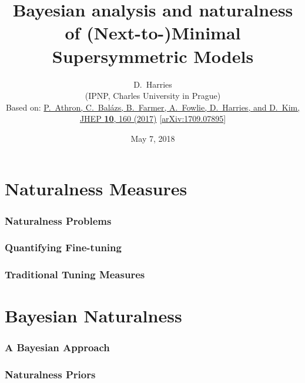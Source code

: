 \documentclass[10pt,aspectratio=169]{beamer}
\title{Bayesian analysis and naturalness of (Next-to-)Minimal
  Supersymmetric Models}
\author{D.~Harries\\
  {\scriptsize
    (IPNP, Charles University in Prague)}\\
  \vspace{25pt}
  { \scriptsize
    Based on: \href{https://doi.org/10.1007/JHEP10(2017)160}{%
      P.~Athron, C.~Bal\'{a}zs, B.~Farmer, A.~Fowlie, D.~Harries,
      and D.~Kim, JHEP \textbf{10}, 160 (2017)}
    [\href{https://arxiv.org/abs/1709.07895}{arXiv:1709.07895}]
  }
}
\date[Phenomenology 2018, University of Pittsburgh]{May 7, 2018}
\begin{document}
\begin{frame}[plain]
  \titlepage
\end{frame}

\section{Naturalness Measures}

\begin{frame}
  \frametitle{Naturalness Problems}
\end{frame}

\begin{frame}
  \frametitle{Quantifying Fine-tuning}
\end{frame}

\begin{frame}
  \frametitle{Traditional Tuning Measures}
\end{frame}

\section{Bayesian Naturalness}

\begin{frame}
  \frametitle{A Bayesian Approach}
\end{frame}

\begin{frame}
  \frametitle{Naturalness Priors}
\end{frame}
\end{document}
